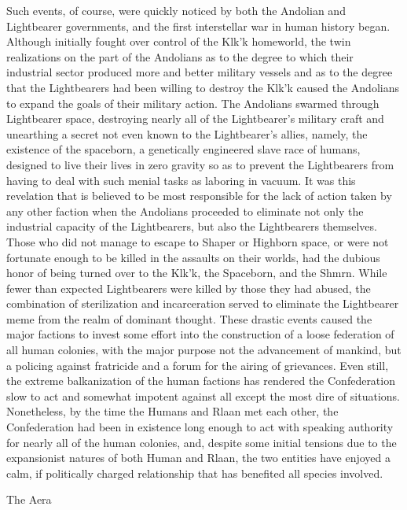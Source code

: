 Such events, of course, were quickly noticed by both the Andolian and Lightbearer governments, and the first interstellar war in human history began. Although initially fought over control of the Klk’k homeworld, the twin realizations on the part of the Andolians as to the degree to which their industrial sector produced more and better military vessels and as to the degree that the Lightbearers had been willing to destroy the Klk’k caused the Andolians to expand the goals of their military action. The Andolians swarmed through Lightbearer space, destroying nearly all of the Lightbearer’s military craft and unearthing a secret not even known to the Lightbearer’s allies, namely, the existence of the spaceborn, a genetically engineered slave race of humans, designed to live their lives in zero gravity so as to prevent the Lightbearers from having to deal with such menial tasks as laboring in vacuum. It was this revelation that is believed to be most responsible for the lack of action taken by any other faction when the Andolians proceeded to eliminate not only the industrial capacity of the Lightbearers, but also the Lightbearers themselves. Those who did not manage to escape to Shaper or Highborn space, or were not fortunate enough to be killed in the assaults on their worlds, had the dubious honor of being turned over to the Klk’k, the Spaceborn, and the Shmrn. While fewer than expected Lightbearers were killed by those they had abused, the combination of sterilization and incarceration served to eliminate the Lightbearer meme from the realm of dominant thought. These drastic events caused the major factions to invest some effort into the construction of a loose federation of all human colonies, with the major purpose not the advancement of mankind, but a policing against fratricide and a forum for the airing of grievances. Even still, the extreme balkanization of the human factions has rendered the Confederation slow to act and somewhat impotent against all except the most dire of situations. Nonetheless, by the time the Humans and Rlaan met each other, the Confederation had been in existence long enough to act with speaking authority for nearly all of the human colonies, and, despite some initial tensions due to the expansionist natures of both Human and Rlaan, the two entities have enjoyed a calm, if politically charged relationship that has benefited all species involved.

The Aera

